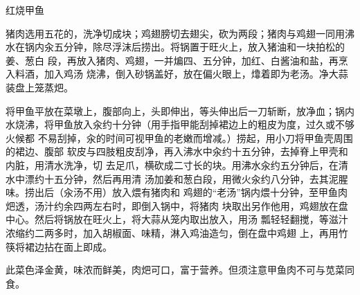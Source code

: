 \begin{recipe}{红烧甲鱼}

\ingredients


\preparation

\step 猪肉选用五花的，洗净切成块；鸡翅膀切去翅尖，砍为两段；猪肉与鸡翅一同用沸
水在锅内汆五分钟，除尽浮沫后捞出。将锅置于旺火上，放入猪油和一块拍松的姜、葱白
段，再放入猪肉、鸡翅，一并煸四、五分钟，加红、白酱油和盐，再烹入料酒，加入鸡汤
烧沸，倒入砂锅盖好，放在偏火眼上，㸆着即为老汤。净大蒜装盘上笼蒸𤆵。

\step 将甲鱼平放在菜墩上，腹部向上，头即伸出，等头伸出后一刀斩断，放净血；锅内
水烧沸，将甲鱼放入汆约十分钟（用手指甲能刮掉裙边上的粗皮为度，过久或不够火候都
不易刮掉，汆的时间可视甲鱼的老嫩而增减。）捞起，用小刀将甲鱼壳周围的裙边、腹部
软皮与四肢粗皮刮净，再入沸水中汆约十五分钟，去掉脊上甲壳和内脏，用清水洗净，切
去足爪，横砍成二寸长的块。用沸水汆约五分钟后，在清水中漂约十五分钟，然后再用清
汤加姜和葱白段，用微火汆约八分钟，去其泥腥味。捞出后（汆汤不用）放入煨有猪肉和
鸡翅的“老汤”锅内煨十分钟，至甲鱼肉𤆵透，汤汁约余四两左右时，即倒入锅中，将猪肉
块取出另作他用，鸡翅放在盘中心。然后将锅放在旺火上，将大蒜从笼内取出放入，用汤
瓢轻轻翻搅，等滋汁浓缩约二两多时，加入胡椒面、味精，淋入鸡油造匀，倒在盘中鸡翅
上，再用竹筷将裙边拈在面上即成。

\features

此菜色泽金黄，味浓而鲜美，肉𤆵可口，富于营养。但须注意甲鱼肉不可与苋菜同食。

\end{recipe}


